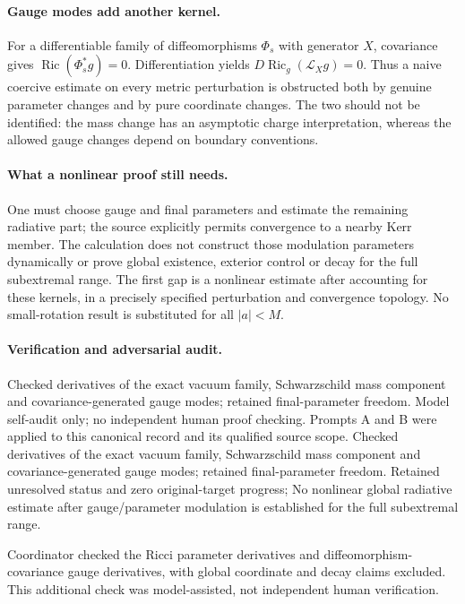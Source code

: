 \documentclass[11pt]{article}
\begin{document}
\paragraph{Gauge modes add another kernel.} For a differentiable family of diffeomorphisms $\Phi_s$ with generator $X$, covariance gives $\operatorname{Ric}(\Phi_s^*g)=0$. Differentiation yields $D\operatorname{Ric}_g(\mathcal L_Xg)=0$. Thus a naive coercive estimate on every metric perturbation is obstructed both by genuine parameter changes and by pure coordinate changes. The two should not be identified: the mass change has an asymptotic charge interpretation, whereas the allowed gauge changes depend on boundary conventions.

\paragraph{What a nonlinear proof still needs.} One must choose gauge and final parameters and estimate the remaining radiative part; the source explicitly permits convergence to a nearby Kerr member. The calculation does not construct those modulation parameters dynamically or prove global existence, exterior control or decay for the full subextremal range. The first gap is a nonlinear estimate after accounting for these kernels, in a precisely specified perturbation and convergence topology. No small-rotation result is substituted for all $|a|<M$.

\paragraph{Verification and adversarial audit.}
Checked derivatives of the exact vacuum family, Schwarzschild mass component and covariance-generated gauge modes; retained final-parameter freedom. Model self-audit only; no independent human proof checking. Prompts A and B were applied to this canonical record and its qualified source scope. Checked derivatives of the exact vacuum family, Schwarzschild mass component and covariance-generated gauge modes; retained final-parameter freedom. Retained unresolved status and zero original-target progress; No nonlinear global radiative estimate after gauge/parameter modulation is established for the full subextremal range.

Coordinator checked the Ricci parameter derivatives and diffeomorphism-covariance gauge derivatives, with global coordinate and decay claims excluded. This additional check was model-assisted, not independent human verification.
\end{document}
